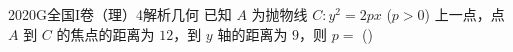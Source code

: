
\begin{problem}{2020}{G}{全国I卷（理）}{4}{解析几何}
已知 $ A $ 为抛物线 $ C: y^2 = 2px $ ($ p > 0 $) 上一点，点 $ A $ 到 $ C $ 的焦点的距离为 $ 12 $，到 $ y $ 轴的距离为 $ 9 $，则 $ p = $ (\hspace{1cm})
\begin{choices}
\end{choices}
\end{problem}

\begin{answer}

\end{answer}

\begin{solutions}

\end{solutions}
